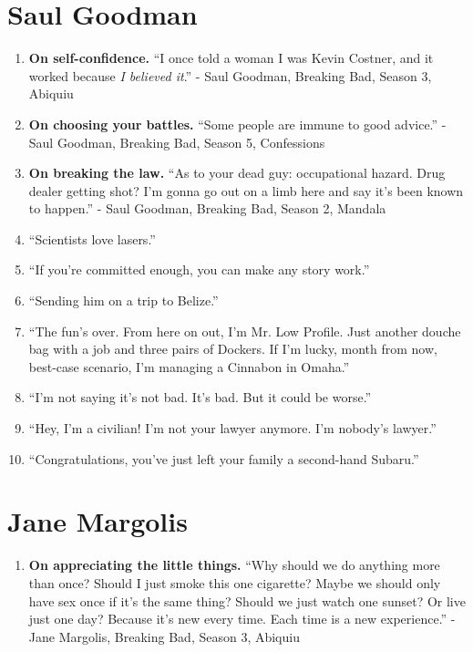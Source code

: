 \documentclass{book}
\numberwithin{equation}{section}
\begin{document}
\section{Saul Goodman}
\begin{enumerate}
    \item \textbf{On self-confidence.} ``I once told a woman I was Kevin Costner, and it worked because \emph{I believed it}.'' - Saul Goodman, Breaking Bad, Season 3, Abiquiu
    \item \textbf{On choosing your battles.} ``Some people are immune to good advice.'' - Saul Goodman, Breaking Bad, Season 5, Confessions
    \item \textbf{On breaking the law.} ``As to your dead guy: occupational hazard. Drug dealer getting shot? I'm gonna go out on a limb here and say it's been known to happen.'' - Saul Goodman, Breaking Bad, Season 2, Mandala
    \item ``Scientists love lasers.''
    \item ``If you're committed enough, you can make any story work.''
    \item ``Sending him on a trip to Belize.''
    \item ``The fun's over. From here on out, I'm Mr. Low Profile. Just another douche bag with a job and three pairs of Dockers. If I'm lucky, month from now, best-case scenario, I'm managing a Cinnabon in Omaha.''
    \item ``I'm not saying it's not bad. It's bad. But it could be worse.''
    \item ``Hey, I'm a civilian! I'm not your lawyer anymore. I'm nobody's lawyer.''
    \item ``Congratulations, you've just left your family a second-hand Subaru.''
\end{enumerate}

\section{Jane Margolis}
\begin{enumerate}
    \item \textbf{On appreciating the little things.} ``Why should we do anything more than once? Should I just smoke this one cigarette? Maybe we should only have sex once if it's the same thing? Should we just watch one sunset? Or live just one day? Because it's new every time. Each time is a new experience.'' - Jane Margolis, Breaking Bad, Season 3, Abiquiu
\end{enumerate}
\end{document}
